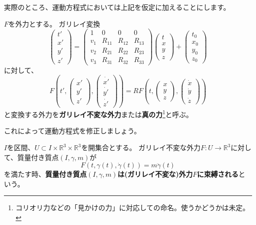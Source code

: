 実際のところ、運動方程式においては上記を仮定に加えることにします。
\begin{definition}
  $F$を外力とする。
  ガリレイ変換
  \[
    \begin{pmatrix}
      t'\\x'\\y'\\z'
    \end{pmatrix}
    =
    \begin{pmatrix}
      1 & 0 & 0 & 0 \\
      v_1 & R_{11} & R_{12} & R_{13} \\
      v_2 & R_{21} & R_{22} & R_{23} \\
      v_3 & R_{31} & R_{32} & R_{33}
    \end{pmatrix}
    \begin{pmatrix}
      t\\x\\y\\z
    \end{pmatrix}
    +
    \begin{pmatrix}
      t_0\\x_0\\y_0\\z_0
    \end{pmatrix}
  \]
  に対して、
  \[
    F\left(t',\begin{pmatrix}x'\\y'\\z'\end{pmatrix},\begin{pmatrix}\dot{x'}\\\dot{y'}\\\dot{z'}\end{pmatrix}\right)=RF\left(t,\begin{pmatrix}x\\y\\z\end{pmatrix},\begin{pmatrix}\dot{x}\\\dot{y}\\\dot{z}\end{pmatrix}\right)
  \]
  と変換する外力を\textbf{ガリレイ不変な外力}または\textbf{真の力}\footnote{
    コリオリ力などの「見かけの力」に対応しての命名。使うかどうかは未定。
  }と呼ぶ。
\end{definition}

これによって運動方程式を修正しましょう。
\begin{definition}[運動方程式]
  $I$を区間、$U\subset I\times\mathbb{R}^3\times\mathbb{R}^3$を開集合とする。
  ガリレイ不変な外力$F:U\to\mathbb{R}^3$に対して、質量付き質点$(I,\gamma,m)$が
  \[
    F(t,\gamma(t),\dot\gamma(t))=m\ddot\gamma(t)
  \]
  を満たす時、\textbf{質量付き質点$(I,\gamma,m)$は(ガリレイ不変な)外力$F$に束縛される}という。
\end{definition}

